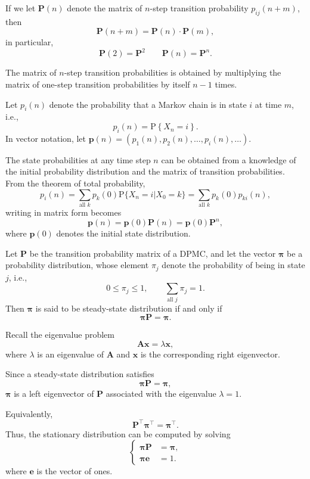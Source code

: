 \documentclass[../Note.tex]{subfiles}
\begin{document}
If we let $\mathbf{P}(n)$ denote the matrix of $n$-step transition probability $p_{ij}(n+m)$, then 
\begin{equation}
    \mathbf{P}(n+m) = \mathbf{P}(n) \cdot \mathbf{P}(m),
\end{equation} 
in particular,
\[
    \mathbf{P}(2) = \mathbf{P}^{2} \qquad \mathbf{P}(n) = \mathbf{P}^{n}.
\]

\begin{remark}
    The matrix of $n$-step transition probabilities is obtained by multiplying the matrix of one-step transition probabilities by itself $n-1$ times.
\end{remark}

Let $p_i(n)$ denote the probability that a Markov chain is in state $i$ at time $m$, i.e.,
\[
    p_i(n) = \mathrm{P} \left\{X_n = i\right\}.
\]
In vector notation, let $\bm{p}(n) = (p_1(n), p_2(n), \dots, p_i(n), \dots)$. 

The state probabilities at any time step $n$ can be obtained from a knowledge of the initial probability distribution and the matrix of transition probabilities. From the theorem of total probability,
\[
    p_i(n) = \sum_{\text{all } k} p_k(0) \mathrm{P}\{X_n = i | X_0 = k\} = \sum_{\text{all } k} p_k(0) p_{ki}(n),
\]
writing in matrix form becomes
\[
    \bm{p}(n) = \bm{p}(0) \mathbf{P}(n) = \bm{p}(0) \mathbf{P}^{n},
\]
where $\bm{p}(0)$ denotes the initial state distribution.

\begin{definition}
    Let $\mathbf{P}$ be the transition probability matrix of a DPMC, and let the vector $\bm{\pi}$ be a probability distribution, whose element $\pi_j$ denote the probability of being in state $j$, i.e., 
    \[
        0 \leq \pi_j \leq 1, \qquad \sum_{\text{all } j } \pi_j = 1.
    \]
    Then $\bm{\pi}$ is said to be steady-state distribution if and only if 
    \[
        \bm{\pi} \mathbf{P} = \bm{\pi}.
    \]
\end{definition} 

\begin{remark}
    Recall the eigenvalue problem
    \[
        \mathbf{A}\bm{x}=\lambda\bm{x},
    \] 
    where $\lambda$ is an eigenvalue of $\mathbf{A}$ and $\bm{x}$ is the corresponding right eigenvector.

    Since a steady-state distribution satisfies
    \[
        \bm{\pi}\mathbf{P}=\bm{\pi},
    \] 
    $\bm{\pi}$ is a left eigenvector of $\mathbf{P}$ associated with the eigenvalue $\lambda=1$.

    Equivalently,
    \[
        \mathbf{P}^{\top}\bm{\pi}^{\top} = \bm{\pi}^{\top}.
    \]
    Thus, the stationary distribution can be computed by solving
    \begin{equation}
    \left\{
    \begin{aligned}
        \bm{\pi}\mathbf{P} &= \bm{\pi}, \\
        \bm{\pi}\bm{e} &= 1.
    \end{aligned}
    \right.        
    \end{equation} 
    where $\bm{e}$ is the vector of ones.
\end{remark}
\end{document}
